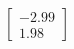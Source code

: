 \documentclass[preview]{standalone}
\begin{document}
\begin{align*}
\begin{bmatrix} -2.99 \\ 1.98 \end{bmatrix}
\end{align*}
\end{document}
